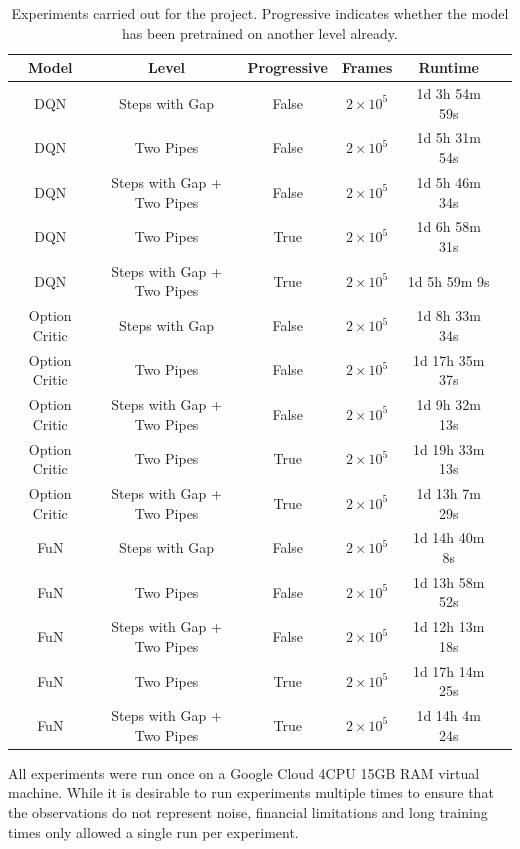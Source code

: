\documentclass[notitlepage,a4paper,11pt]{article}
\begin{document}
\begin{table}[h!]
\centering
\begin{tabular}{ |c|c|c|c|c|c| } 
 \hline
 \textbf{Model} & \textbf{Level} & \textbf{Progressive} & \textbf{Frames} & \textbf{Runtime}\\
 \hline 
 DQN & Steps with Gap & False & $2 \times 10^5$ & 1d 3h 54m 59s\\ 
 \hline
 DQN & Two Pipes & False & $2 \times 10^5$ & 1d 5h 31m 54s\\ 
 \hline
 DQN & Steps with Gap + Two Pipes & False & $2 \times 10^5$ & 1d 5h 46m 34s \\ 
 \hline
DQN & Two Pipes & True & $2 \times 10^5$ & 1d 6h 58m 31s\\ 
 \hline
 DQN & Steps with Gap + Two Pipes & True & $2 \times 10^5$ & 1d 5h 59m 9s\\ 
 \hline 
 Option Critic & Steps with Gap & False & $2 \times 10^5$ & 1d 8h 33m 34s\\ 
 \hline
 Option Critic & Two Pipes & False & $2 \times 10^5$ & 1d 17h 35m 37s\\ 
 \hline
 Option Critic & Steps with Gap + Two Pipes & False & $2 \times 10^5$ & 1d 9h 32m 13s\\ 
 \hline
Option Critic & Two Pipes & True & $2 \times 10^5$ & 1d 19h 33m 13s\\ 
 \hline
 Option Critic & Steps with Gap + Two Pipes & True & $2 \times 10^5$ & 1d 13h 7m 29s\\ 
 \hline
 
  FuN & Steps with Gap & False & $2 \times 10^5$ & 1d 14h 40m 8s\\ 
 \hline
 FuN & Two Pipes & False & $2 \times 10^5$ & 1d 13h 58m 52s\\ 
 \hline
 FuN & Steps with Gap + Two Pipes & False & $2 \times 10^5$ & 1d 12h 13m 18s\\ 
 \hline
FuN & Two Pipes & True & $2 \times 10^5$ & 1d 17h 14m 25s\\ 
 \hline
 FuN & Steps with Gap + Two Pipes & True & $2 \times 10^5$ & 1d 14h 4m 24s\\ 
 \hline
 
\end{tabular}
\caption{Experiments carried out for the project. Progressive indicates whether the model has been pretrained on another level already.}
\label{tbl:experiments}
\end{table}

All experiments were run once on a Google Cloud 4CPU 15GB RAM virtual machine. While it is desirable to run experiments multiple times to ensure that the observations do not represent noise, financial limitations and long training times only allowed a single run per experiment. 
\end{document}
